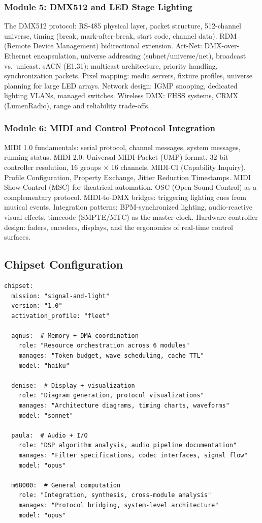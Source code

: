 \documentclass[11pt,letterpaper]{article}
\begin{document}
\subsubsection{Module 5: DMX512 and LED Stage Lighting}
The DMX512 protocol: RS-485 physical layer, packet structure, 512-channel universe, timing (break, mark-after-break, start code, channel data). RDM (Remote Device Management) bidirectional extension. Art-Net: DMX-over-Ethernet encapsulation, universe addressing (subnet/universe/net), broadcast vs.\ unicast. sACN (E1.31): multicast architecture, priority handling, synchronization packets. Pixel mapping: media servers, fixture profiles, universe planning for large LED arrays. Network design: IGMP snooping, dedicated lighting VLANs, managed switches. Wireless DMX: FHSS systems, CRMX (LumenRadio), range and reliability trade-offs.

\subsubsection{Module 6: MIDI and Control Protocol Integration}
MIDI 1.0 fundamentals: serial protocol, channel messages, system messages, running status. MIDI 2.0: Universal MIDI Packet (UMP) format, 32-bit controller resolution, 16 groups $\times$ 16 channels, MIDI-CI (Capability Inquiry), Profile Configuration, Property Exchange, Jitter Reduction Timestamps. MIDI Show Control (MSC) for theatrical automation. OSC (Open Sound Control) as a complementary protocol. MIDI-to-DMX bridges: triggering lighting cues from musical events. Integration patterns: BPM-synchronized lighting, audio-reactive visual effects, timecode (SMPTE/MTC) as the master clock. Hardware controller design: faders, encoders, displays, and the ergonomics of real-time control surfaces.

\subsection{Chipset Configuration}

\begin{asciibox}
\begin{verbatim}
chipset:
  mission: "signal-and-light"
  version: "1.0"
  activation_profile: "fleet"

  agnus:  # Memory + DMA coordination
    role: "Resource orchestration across 6 modules"
    manages: "Token budget, wave scheduling, cache TTL"
    model: "haiku"

  denise:  # Display + visualization
    role: "Diagram generation, protocol visualizations"
    manages: "Architecture diagrams, timing charts, waveforms"
    model: "sonnet"

  paula:  # Audio + I/O
    role: "DSP algorithm analysis, audio pipeline documentation"
    manages: "Filter specifications, codec interfaces, signal flow"
    model: "opus"

  m68000:  # General computation
    role: "Integration, synthesis, cross-module analysis"
    manages: "Protocol bridging, system-level architecture"
    model: "opus"
\end{verbatim}
\end{asciibox}
\end{document}
